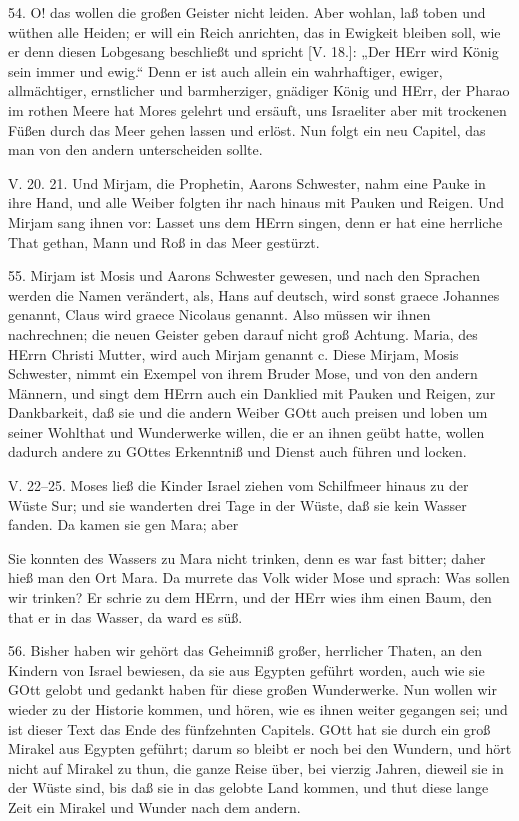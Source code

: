 54. O! das wollen die großen Geister nicht leiden. Aber wohlan, laß toben und wüthen alle Heiden; er will ein Reich anrichten, das in Ewigkeit bleiben soll, wie er denn diesen Lobgesang beschließt und spricht [V. 18.]: „Der HErr wird König sein immer und ewig.“ Denn er ist auch allein ein wahrhaftiger, ewiger, allmächtiger, ernstlicher und barmherziger, gnädiger König und HErr, der Pharao im rothen Meere hat Mores gelehrt und ersäuft, uns Israeliter aber mit trockenen Füßen durch das Meer gehen lassen und erlöst. Nun folgt ein neu Capitel, das man von den andern unterscheiden sollte.

\begin{schriftzitat}
V. 20. 21. Und Mirjam, die Prophetin, Aarons Schwester, nahm eine Pauke in ihre Hand, und alle Weiber folgten ihr nach hinaus mit Pauken und Reigen. Und Mirjam sang ihnen vor: Lasset uns dem HErrn singen, denn er hat eine herrliche That gethan, Mann und Roß in das Meer gestürzt.
\end{schriftzitat}

55. Mirjam ist Mosis und Aarons Schwester gewesen, und nach den Sprachen werden die Namen verändert, als, Hans auf deutsch, wird sonst graece Johannes genannt, Claus wird graece Nicolaus genannt. Also müssen wir ihnen nachrechnen; die neuen Geister geben darauf nicht groß Achtung. Maria, des HErrn Christi Mutter, wird auch Mirjam genannt c. Diese Mirjam, Mosis Schwester, nimmt ein Exempel von ihrem Bruder Mose, und von den andern Männern, und singt dem HErrn auch ein Danklied mit Pauken und Reigen, zur Dankbarkeit, daß sie und die andern Weiber GOtt auch preisen und loben um seiner Wohlthat und Wunderwerke willen, die er an ihnen geübt hatte, wollen dadurch andere zu GOttes Erkenntniß und Dienst auch führen und locken.

\begin{schriftzitat}
V. 22–25. Moses ließ die Kinder Israel ziehen vom Schilfmeer hinaus zu der Wüste Sur; und sie wanderten drei Tage in der Wüste, daß sie kein Wasser fanden. Da kamen sie gen Mara; aber
\end{schriftzitat}

Sie konnten des Wassers zu Mara nicht trinken, denn es war fast bitter; daher hieß man den Ort Mara. Da murrete das Volk wider Mose und sprach: Was sollen wir trinken? Er schrie zu dem HErrn, und der HErr wies ihm einen Baum, den that er in das Wasser, da ward es süß.

56. Bisher haben wir gehört das Geheimniß großer, herrlicher Thaten, an den Kindern von Israel bewiesen, da sie aus Egypten geführt worden, auch wie sie GOtt gelobt und gedankt haben für diese großen Wunderwerke. Nun wollen wir wieder zu der Historie kommen, und hören, wie es ihnen weiter gegangen sei; und ist dieser Text das Ende des fünfzehnten Capitels. GOtt hat sie durch ein groß Mirakel aus Egypten geführt; darum so bleibt er noch bei den Wundern, und hört nicht auf Mirakel zu thun, die ganze Reise über, bei vierzig Jahren, dieweil sie in der Wüste sind, bis daß sie in das gelobte Land kommen, und thut diese lange Zeit ein Mirakel und Wunder nach dem andern.

